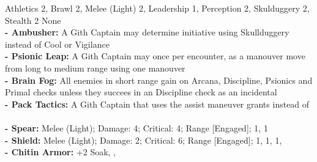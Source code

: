 \Creature[name=Gith Captain, type=Rival, brawn=3, agility=3, presence=1, soak=5, wounds=12]{
} {
    Athletics 2, Brawl 2, Melee (Light) 2, Leadership 1, Perception 2, Skulduggery 2, Stealth 2
}{
    None
}{
    \\ %
    \textbf{- Ambusher:} A Gith Captain may determine initiative using Skullduggery instead of Cool or Vigilance\\
    \textbf{- Psionic Leap:} A Gith Captain may once per encounter, as a manouver move from long to medium range using one manouver\\
    \textbf{- Brain Fog:} All enemies in short range gain \setback on Arcana, Discipline, Psionics and Primal checks unless they succees in an Discipline check as an incidental\\
    \textbf{- Pack Tactics:} A Gith Captain that uses the assist maneuver grants \boost\boost instead of \boost\\
}{
    \\ %
    \textbf{- Spear:} Melee (Light); Damage: 4; Critical: 4; Range [Engaged];  1,  1\\
    \textbf{- Shield:} Melee (Light); Damage: 2; Critical: 6; Range [Engaged];  1,  1,  1, \\
    \textbf{- Chitin Armor:} +2 Soak, , \\
}

